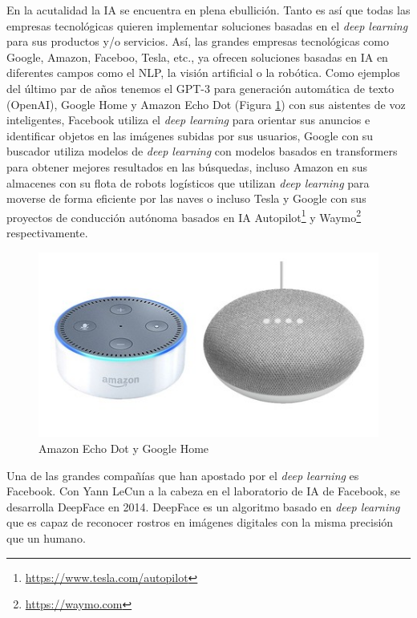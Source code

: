 En la acutalidad la IA se encuentra en plena ebullición. Tanto es así que todas las empresas tecnológicas quieren implementar soluciones basadas en el \textit{deep learning} para sus productos y/o servicios. Así, las grandes empresas tecnológicas como Google, Amazon, Faceboo, Tesla, etc., ya ofrecen soluciones basadas en IA en diferentes campos como el NLP, la visión artificial o la robótica. Como ejemplos del último par de años tenemos el GPT-3 para generación automática de texto (OpenAI), Google Home y Amazon Echo Dot (Figura \ref{fig:homeecho}) con sus aistentes de voz inteligentes, Facebook utiliza el \textit{deep learning} para orientar sus anuncios e identificar objetos en las imágenes subidas por sus usuarios, Google con su buscador utiliza modelos de \textit{deep learning} con modelos basados en transformers para obtener mejores resultados en las búsquedas, incluso Amazon en sus almacenes con su flota de robots logísticos que utilizan \textit{deep learning} para moverse de forma eficiente por las naves o incluso Tesla y Google con sus proyectos de conducción autónoma basados en IA Autopilot\footnote{\url{https://www.tesla.com/autopilot}} y Waymo\footnote{\url{https://waymo.com}} respectivamente.

\begin{figure}
  \centering
  \includegraphics[width=.9\linewidth]{img/homeecho.jpg}
  \caption{Amazon Echo Dot y Google Home}
  \label{fig:homeecho}
\end{figure}


Una de las grandes compañías que han apostado por el \textit{deep learning} es Facebook. Con Yann LeCun a la cabeza en el laboratorio de IA de Facebook, se desarrolla DeepFace \cite{deepface} en 2014. DeepFace es un algoritmo basado en \textit{deep learning} que es capaz de reconocer rostros en imágenes digitales con la misma precisión que un humano.

